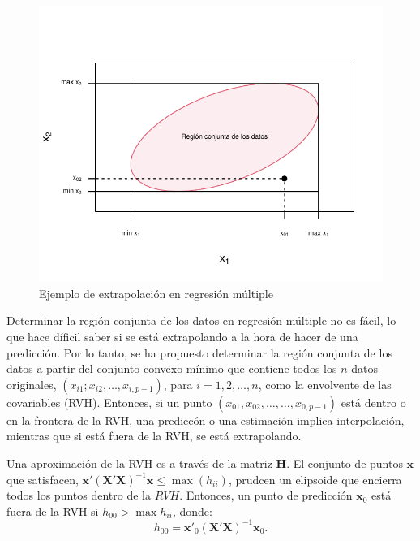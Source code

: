 \documentclass[
]{article}
\begin{document}
\begin{figure}

{\centering \includegraphics{MLGI_files/figure-latex/extrapolacionOculta-1} 

}

\caption{Ejemplo de extrapolación en regresión múltiple}\label{fig:extrapolacionOculta}
\end{figure}

Determinar la región conjunta de los datos en regresión múltiple no es fácil, lo que hace díficil saber si se está extrapolando a la hora de hacer de una predicción. Por lo tanto, se ha propuesto determinar la región conjunta de los datos a partir del conjunto convexo mínimo que contiene todos los \(n\) datos originales, \((x_{i1}; x_{i2},\ldots,x_{i,p-1})\), para \(i = 1,2,\ldots,n\), como la envolvente de las covariables (RVH). Entonces, si un punto \((x_{01},x_{02}, \ldots,\ldots, x_{0,p-1})\) está dentro o en la frontera de la RVH, una prediccón o una estimación implica interpolación, mientras que si está fuera de la RVH, se está extrapolando.

Una aproximación de la RVH es a través de la matriz \(\boldsymbol H\). El conjunto de puntos \(\boldsymbol x\) que satisfacen, \(\boldsymbol x'(\boldsymbol X'\boldsymbol X)^{-1}\boldsymbol x\leq \max(h_{ii})\), prudcen un elipsoide que encierra todos los puntos dentro de la \(RVH\). Entonces, un punto de predicción \(\boldsymbol x_{0}\) está fuera de la RVH si \(h_{00} > \max{h_{ii}}\), donde:
\[
h_{00} = \boldsymbol x'_{0}(\boldsymbol X'\boldsymbol X)^{-1}\boldsymbol x_{0}.
\]
\end{document}
